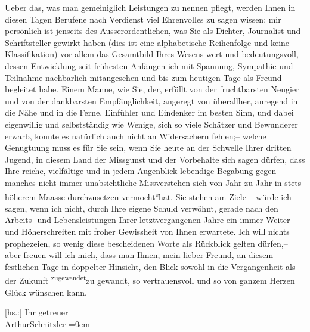 \pstart
           Ueber das, was man gemeiniglich Leistungen zu nennen pflegt, werden Ihnen in diesen
               Tagen Berufene nach Verdienst viel Ehrenvolles zu sagen wissen; mir persönlich ist
                   jenseits 
               des Ausserordentlichen, was Sie als Dichter, Journalist und Schriftsteller gewirkt
               haben (dies ist eine alphabetische Reihenfolge und keine Klassifikation) {\pb}\introOben{}vor allem\introOben{} das Gesamtbild Ihres Wesens wert und
               bedeutungsvoll, dessen Entwicklung seit frühesten Anfängen ich mit Spannung,
               Sympathie und Teilnahme nachbarlich mitangesehen und bis zum heutigen Tage als Freund
               begleitet habe. Einem Manne, wie Sie, der, erfüllt von der fruchtbarsten Neugier und
               von der dankbarsten Empfänglichkeit, angeregt von überallher, anregend in die Nähe
               und in die Ferne, Einfühler und Eindenker im besten Sinn, und dabei eigenwillig und
               selbstständig wie Wenige, sich so viele Schätzer und Bewunderer erwarb, konnte es
               natürlich auch nicht an Widersachern fehlen;– welche Genugtuung muss es für Sie sein,
               wenn Sie heute an der Schwelle Ihrer dritten Jugend, in diesem Land der Missgunst und
               der Vorbehalte sich sagen dürfen, dass Ihre reiche, vielfältige und in jedem
               Augenblick lebendige Begabung {\pb}gegen manches nicht immer unabsichtliche
               Missverstehen sich von Jahr zu Jahr in stets höherem Maasse durchzusetzen vermocht\substVorne{}\textsuperscript{e}\substDazwischen{}{ }hat\substHinten{}.
               Sie stehen am Ziele – würde ich sagen, wenn ich nicht, durch Ihre eigene Schuld
                     verwöhnt, gerade nach den Arbeits- und Lebensleistungen Ihrer
               letztvergangenen Jahre ein
                     immer Weiter- und Höherschreiten mit froher Gewissheit von
               Ihnen erwartete. Ich will nichts prophezeien, so wenig diese bescheidenen
               Worte als Rückblick gelten dürfen,– aber
                     freuen will ich mich, dass man Ihnen, mein lieber Freund, an
                  diesem
                     festlichen Tage in doppelter Hinsicht, den Blick sowohl in die
               Vergangenheit als der Zukunft \substVorne{}\textsuperscript{zugewendet}{\allowbreak}\substDazwischen{}zu gewandt\substHinten{}, so vertrauensvoll und so von
               ganzem Herzen Glück wünschen kann. \pend
           
\pstart
           {[}hs.:{]} Ihr getreuer{\\[\baselineskip]}\spacefill\mbox{ArthurSchnitzler}\pend
           \leftskip=0em{}\endnumbering{}  
      